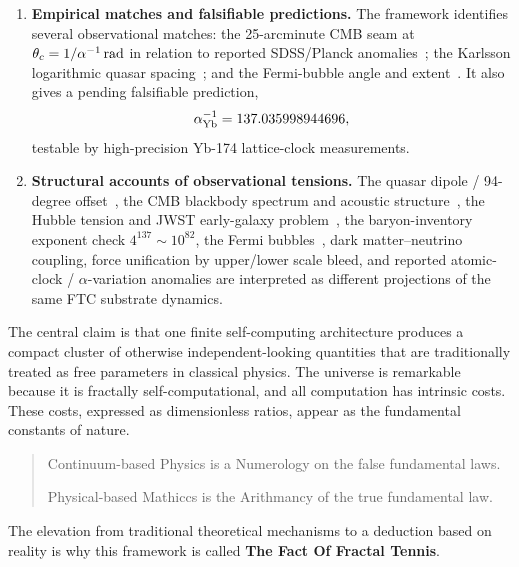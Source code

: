 \documentclass[11pt,a4paper]{article}
\begin{document}
\begin{enumerate}
  \item \textbf{Empirical matches and falsifiable predictions.}
  The framework identifies several observational matches: the 25-arcminute
  CMB seam at \(\theta_c=1/\alpha^{-1}\,{\rm rad}\) in relation to reported
  SDSS/Planck anomalies~\cite{Secrest2022,Secrest2025,Planck2018VI,Minami2020};
  the Karlsson logarithmic quasar spacing~\cite{Karlsson1971,Mal2020}; and
  the Fermi-bubble angle and extent~\cite{Su2010,Dobler2010,Ackermann2014,Sarkar2015}.
  It also gives a pending falsifiable prediction,
  \[
  \alpha^{-1}_{\rm Yb}=137.035998944696,
  \]
  testable by high-precision Yb-174 lattice-clock measurements.

  \item \textbf{Structural accounts of observational tensions.}
  The quasar dipole / 94-degree offset~\cite{Secrest2022,Secrest2025}, the
  CMB blackbody spectrum and acoustic structure~\cite{Planck2018VI}, the
  Hubble tension and JWST early-galaxy problem~\cite{Riess2025,Naidu2025},
  the baryon-inventory exponent check \(4^{137}\sim10^{82}\), the Fermi
  bubbles~\cite{Su2010,Ackermann2014}, dark matter--neutrino coupling,
  force unification by upper/lower scale bleed, and reported atomic-clock /
  \(\alpha\)-variation anomalies \cite{Guena2012} are interpreted as
  different projections of the same FTC substrate dynamics.

\end{enumerate}

The central claim is that one finite self-computing architecture produces a compact cluster of otherwise independent-looking quantities that are traditionally treated as free parameters in classical physics. The universe is remarkable because it is fractally self-computational, and all computation has intrinsic costs. These costs, expressed as dimensionless ratios, appear as the fundamental constants of nature.

\begin{quote}

Continuum-based Physics is a Numerology on the false fundamental laws.

Physical-based Mathiccs is the Arithmancy of the true fundamental law.

\end{quote}

The elevation from traditional theoretical mechanisms to a deduction based on reality is why this framework is called \textbf{The Fact Of Fractal Tennis}. 

\end{document}
